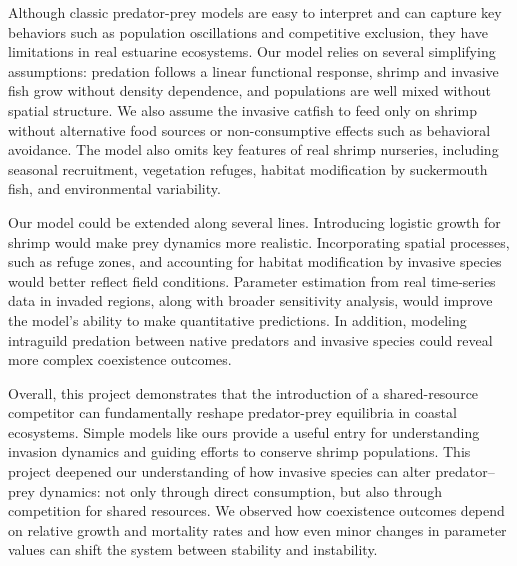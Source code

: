 \documentclass{article}
\begin{document}
\vspace{5mm}

\noindent Although classic predator-prey models are easy to interpret and can capture key behaviors such as population oscillations and competitive exclusion, they have limitations in real estuarine ecosystems. Our model relies on several simplifying assumptions: predation follows a linear functional response, shrimp and invasive fish grow without density dependence, and populations are well mixed without spatial structure. We also assume the invasive catfish to feed only on shrimp without alternative food sources or non-consumptive effects such as behavioral avoidance. The model also omits key features of real shrimp nurseries, including seasonal recruitment, vegetation refuges, habitat modification by suckermouth fish, and environmental variability.

\vspace{5mm}

\noindent Our model could be extended along several lines. Introducing logistic growth for shrimp would make prey dynamics more realistic. Incorporating spatial processes, such as refuge zones, and accounting for habitat modification by invasive species would better reflect field conditions. Parameter estimation from real time-series data in invaded regions, along with broader sensitivity analysis, would improve the model’s ability to make quantitative predictions. In addition, modeling intraguild predation between native predators and invasive species could reveal more complex coexistence outcomes.

\vspace{5mm}

\noindent Overall, this project demonstrates that the introduction of a shared-resource competitor can fundamentally reshape predator-prey equilibria in coastal ecosystems. Simple models like ours provide a useful entry for understanding invasion dynamics and guiding efforts to conserve shrimp populations. This project deepened our understanding of how invasive species can alter predator–prey dynamics: not only through direct consumption, but also through competition for shared resources. We observed how coexistence outcomes depend on relative growth and mortality rates and how even minor changes in parameter values can shift the system between stability and instability. 
\end{document}
